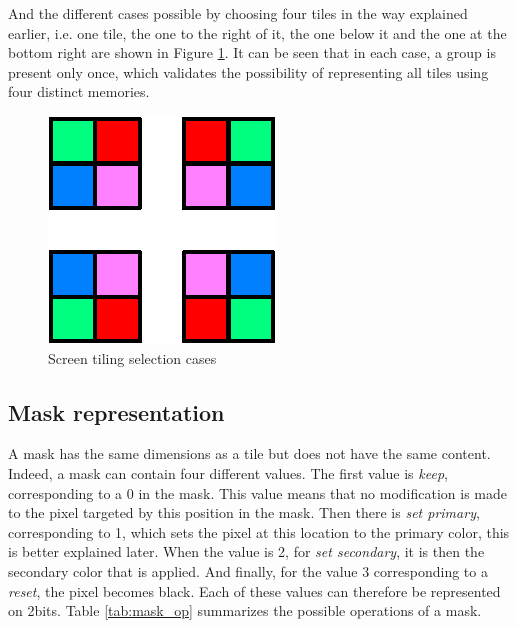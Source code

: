 And the different cases possible by choosing four tiles in the way explained earlier, i.e. one 
tile, the one to the right of it, the one below it and the one at the bottom right are shown in
Figure \ref{fig:gpu/screen_tiling_cases}. It can be seen that in each case, a group is present only 
once, which validates the possibility of representing all tiles using four distinct memories.

\begin{figure}[H]
    \centering
    \includegraphics[scale=1.0]{Chapter4-GPU_CLKU/res/screen_tiling_cases}
    \caption{Screen tiling selection cases}
    \label{fig:gpu/screen_tiling_cases}
\end{figure}

\subsection{Mask representation}

A mask has the same dimensions as a tile but does not have the same content. Indeed, a mask can 
contain four different values. The first value is \textit{keep}, corresponding to a 0 in the mask. This 
value means that no modification is made to the pixel targeted by this position in the 
mask. Then there is \textit{set primary}, corresponding to 1, which sets the pixel at this 
location to the primary color, this is better explained later. When the value is 2, 
for \textit{set secondary}, it is then the secondary color that is applied. And 
finally, for the value 3 corresponding to a \textit{reset}, the pixel becomes black. Each of these 
values can therefore be represented on 2bits. Table \ref{tab:mask_op} summarizes the possible 
operations of a mask. 

